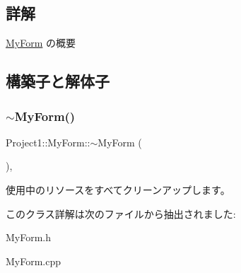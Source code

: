 \subsection{詳解}
\hyperlink{class_project1_1_1_my_form}{My\+Form} の概要 



\subsection{構築子と解体子}
\mbox{\label{class_project1_1_1_my_form_a501b2b4481b72877fc73101f1d6f26be}} 
\subsubsection{\texorpdfstring{$\sim$\+My\+Form()}{~MyForm()}}
{\footnotesize\ttfamily Project1\+::\+My\+Form\+::$\sim$\+My\+Form (\begin{DoxyParamCaption}{ }\end{DoxyParamCaption})\hspace{0.3cm}{\ttfamily [inline]}, {\ttfamily [protected]}}



使用中のリソースをすべてクリーンアップします。 



このクラス詳解は次のファイルから抽出されました\+:\begin{DoxyCompactItemize}
\item 
My\+Form.\+h\item 
My\+Form.\+cpp\end{DoxyCompactItemize}
